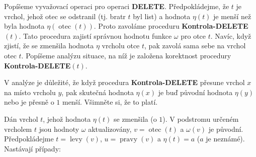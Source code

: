\documentclass[a4paper,12pt]{article}
\DeclareMathOperator*{\otec}{otec}
\DeclareMathOperator*{\levy}{levy}
\DeclareMathOperator*{\pravy}{pravy}
\begin{document}
Popíšeme vyvažovací operaci pro operaci 
{\bf DELETE}.  Před\-po\-kládejme, že $t$ je vrchol, jehož otec se 
odstranil (tj.  bratr $t$ byl list) a hodnota $\eta (t)$ je menší 
než byla hodnota $\eta (\otec(t))$.  Proto zavoláme proceduru 
{\bf Kontrola-DELETE$(t)$}.  Tato procedura zajistí správnou 
hodnotu funkce $\omega$ pro otce $t$.  Navíc, když zjistí, že se 
zmenšila hodnota $\eta$ vrcholu otce $t$, pak zavolá sama sebe 
na vrchol otec $t$. Popíšeme analýzu situace, na níž je 
založena korektnost procedury {\bf Kontrola-DELETE$(t)$}.  

V analýze je důležité, že když procedura {\bf Kontrola-DELETE }
přesune vrchol $x$ na místo vrcholu $y$, pak skutečná hodnota $
\eta (x)$ 
je buď původní hodnota $\eta (y)$ nebo je přesně o $
1$ menší. Všimněte si, že to platí. 

Dán vrchol $t$, jehož hodnota $\eta (t)$ se zmenšila (o $
1$).  V 
podstromu určeném vrcholem $t$ jsou hodnoty $\omega$ aktualizovány, 
$v=\otec(t)$ a $\omega (v)$ je původní.  Předpokládejme 
$t=\levy(v)$, $u=\pravy(v)$ a $\eta (t)=a$ ($a$ je neznámé).  Nastávají 
případy:
\end{document}
